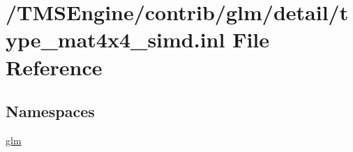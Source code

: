 \hypertarget{type__mat4x4__simd_8inl}{}\section{/\+T\+M\+S\+Engine/contrib/glm/detail/type\+\_\+mat4x4\+\_\+simd.inl File Reference}
\label{type__mat4x4__simd_8inl}
\subsection*{Namespaces}
\begin{DoxyCompactItemize}
\item 
 \hyperlink{namespaceglm}{glm}
\end{DoxyCompactItemize}
